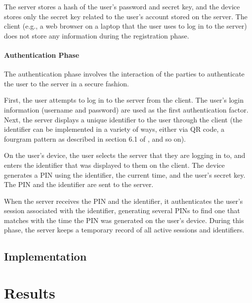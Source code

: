 \documentclass[11pt]{article} %
\begin{document}
The server stores a hash of the user's password and secret key, and the
device stores only the secret key related to the user's account stored
on the server. The client (e.g., a web browser on a laptop that the user
uses to log in to the server) does not store any information during the
registration phase. 

\paragraph{Authentication Phase}
The authentication phase involves the interaction of the parties to
authenticate the user to the server in a secure fashion. 

First, the user attempts to log in to the server from the client. The
user's login information (username and password) are used as the first
authentication factor. Next, the server displays a unique identifier to
the user through the client (the identifier can be implemented in a
variety of ways, either via QR code, a fourgram pattern as described in
section 6.1 of \cite{shirvanian2d2fa}, and so on). 

On the user's device, the user selects the server that they are logging
in to, and enters the identifier that was displayed to them on the
client. The device generates a PIN using the identifier, the current
time, and the user's secret key. The PIN and the identifier are sent to
the server.

When the server receives the PIN and the identifier, it authenticates
the user's session associated with the identifier, generating several
PINs to find one that matches with the time the PIN was generated on the
user's device. During this phase, the server keeps a temporary record of
all active sessions and identifiers.

\subsection{Implementation}




\section{Results}



\end{document}
